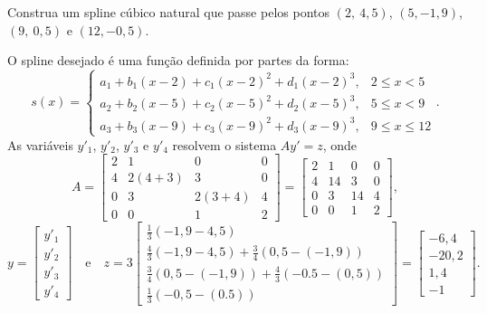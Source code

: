 \begin{ex}Construa um spline cúbico natural que passe pelos pontos $(2,~4,5)$, $(5,-1,9)$, $(9,~0,5)$ e $(12,-0,5)$.
\end{ex}
\begin{sol}
O spline desejado é uma função definida por partes da forma:
\begin{equation}
	s(x)=\left\{\begin{array}{ll}
		a_1+b_1(x-2)+c_1(x-2)^2+d_1(x-2)^3 ,& 2\leq x <5\\
	    a_2+b_2(x-5)+c_2(x-5)^2+d_2(x-5)^3 ,& 5\leq x <9\\
	    a_3+b_3(x-9)+c_3(x-9)^2+d_3(x-9)^3 ,& 9\leq x \leq 12
	\end{array}\right..
\end{equation}
As variáveis $y'_1$, $y'_2$, $y'_3$ e $y'_4$ resolvem o sistema $Ay' = z$, onde
\begin{equation*}
	A = \begin{bmatrix}
		2 &1&0&0 \\
		4&2(4+3)&3&0\\
		0&3&2(3+4)&4\\
		0&0&1&2
	\end{bmatrix} = \begin{bmatrix}
		2 &1&0&0 \\
		4&14&3&0\\
		0&3&14&4\\
		0&0&1&2
	\end{bmatrix}  ,
\end{equation*}
\begin{equation*}
	y = \begin{bmatrix}
		y'_1\\
		y'_2\\
		y'_3\\
		y'_4
	\end{bmatrix} \quad \text{e}\quad
	z = 3\begin{bmatrix}
		\frac{1}{3}(-1,9-4,5)\\
		\frac{4}{3}(-1,9-4,5)+\frac{3}{4}(0,5-(-1,9))\\
		\frac{3}{4}(0,5-(-1,9))+\frac{4}{3}(-0.5-(0,5))\\
		\frac{1}{3}(-0,5-(0.5))
	\end{bmatrix} = \begin{bmatrix}
		-6,4\\
		-20,2\\
		1,4\\
		-1
	\end{bmatrix} .
\end{equation*}

\end{sol}
